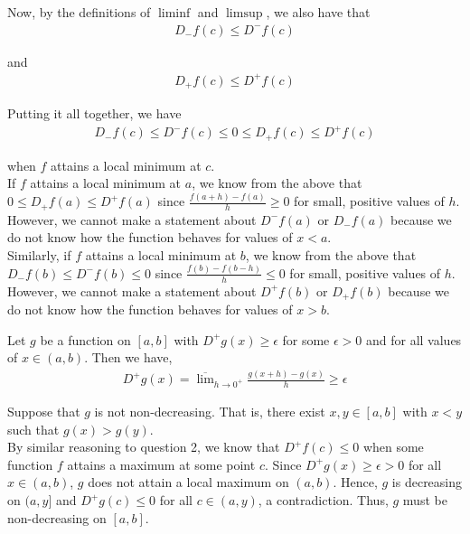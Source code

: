 \documentclass[12pt]{article}
\newenvironment{problem}[2][Problem]{\begin{trivlist}
\item[\hskip \labelsep {\bfseries #1}\hskip \labelsep {\bfseries #2.}]}{\end{trivlist}}
\begin{document}
Now, by the definitions of $\liminf$ and $\limsup$, we also have that
\begin{align*}
D_-f(c) \leq D^-f(c)
\end{align*}

and
\begin{align*}
D_+f(c) \leq D^+f(c)
\end{align*}

Putting it all together, we have
\begin{align*}
D_-f(c) \leq D^-f(c) \leq 0 \leq D_+f(c) \leq D^+f(c)
\end{align*}

when $f$ attains a local minimum at $c$.\\

If $f$ attains a local minimum at $a$, we know from the above that $0 \leq D_+f(a) \leq D^+f(a)$ since $\frac{f(a+h) - f(a)}{h} \geq 0$ for small, positive values of $h$. However, we cannot make a statement about $D^-f(a)$ or $D_-f(a)$ because we do not know how the function behaves for values of $x < a$.\\

Similarly, if $f$ attains a local minimum at $b$, we know from the above that $D_-f(b) \leq D^-f(b) \leq 0$ since $\frac{f(b) - f(b-h)}{h} \leq 0$ for small, positive values of $h$. However, we cannot make a statement about $D^+f(b)$ or $D_+f(b)$ because we do not know how the function behaves for values of $x > b$.

\newpage
\begin{problem}{3}
\end{problem}

Let $g$ be a function on $[a, b]$ with $D^+g(x) \geq \epsilon$ for some $\epsilon > 0$ and for all values of $x \in (a, b)$. Then we have,
\begin{align*}
D^+g(x) = \overline{\lim}_{h \to 0^+} \frac{g(x+h) - g(x)}{h} \geq \epsilon
\end{align*}

Suppose that $g$ is not non-decreasing. That is, there exist $x, y \in [a, b]$ with $x < y$ such that $g(x) > g(y)$.\\

By similar reasoning to question 2, we know that $D^+f(c) \leq 0$ when some function $f$ attains a maximum at some point $c$. Since $D^+g(x) \geq \epsilon > 0$ for all $x \in (a, b)$, $g$ does not attain a local maximum on $(a, b)$. Hence, $g$ is decreasing on $(a, y]$ and $D^+g(c) \leq 0$ for all $c \in (a, y)$, a contradiction. Thus, $g$ must be non-decreasing on $[a, b]$.\\
\end{document}
